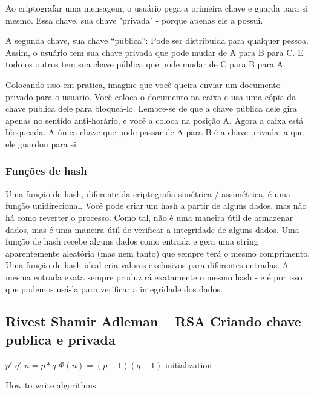 Ao criptografar uma mensagem, o usuário pega a primeira chave e guarda para si mesmo. Essa chave, sua chave "privada" - porque apenas ele a possui.

A segunda chave, sua chave “pública”: Pode ser distribuida para qualquer pessoa. Assim, o usuário tem sua chave privada que pode mudar de A para B para C. E todo os outros tem sua chave pública que pode mudar de C para B para A.

Colocando isso em pratica, imagine que você queira enviar um documento privado para o usuario. Você coloca o documento na caixa e usa uma cópia da chave pública dele para bloqueá-lo. Lembre-se de que a chave pública dele gira apenas no sentido anti-horário, e você a coloca na posição A. Agora a caixa está bloqueada. A única chave que pode passar de A para B é a chave privada, a que ele guardou para si.

\subsubsection{Funções de hash}
Uma função de hash, diferente da criptografia simétrica / assimétrica, é uma função unidirecional. Você pode criar um hash a partir de alguns dados, mas não há como reverter o processo. Como tal, não é uma maneira útil de armazenar dados, mas é uma maneira útil de verificar a integridade de alguns dados.
Uma função de hash recebe alguns dados como entrada e gera uma string aparentemente aleatória (mas nem tanto) que sempre terá o mesmo comprimento. Uma função de hash ideal cria valores exclusivos para diferentes entradas. A mesma entrada exata sempre produzirá exatamente o mesmo hash - e é por isso que podemos usá-la para verificar a integridade dos dados.

\subsection{Rivest Shamir Adleman – RSA Criando chave publica e privada}

\begin{algorithm}[H]
  \SetAlgoLined
   $p\prime$
   \newline
   $q\prime$
   \newline
   $n = p * q$
   \newline
   $\Phi(n)=(p-1)(q-1)$
   \newline
   initialization\;
   \caption{How to write algorithms}
  \end{algorithm}

